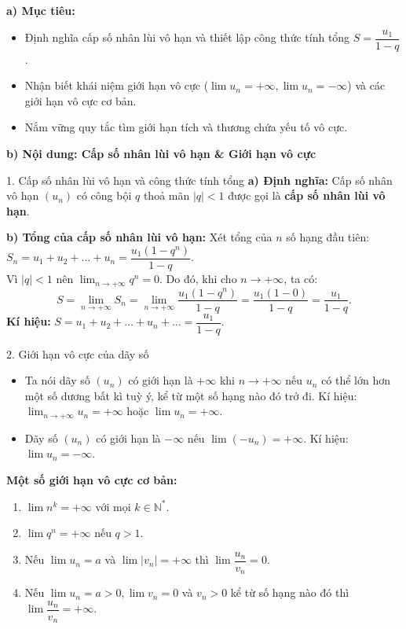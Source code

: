 \documentclass[12pt, a4paper]{article}
\begin{document}
\noindent \textbf{a) Mục tiêu:}
\begin{itemize}[leftmargin=0.6cm]
    \item Định nghĩa cấp số nhân lùi vô hạn và thiết lập công thức tính tổng $S = \dfrac{u_1}{1 - q}$.
    \item Nhận biết khái niệm giới hạn vô cực ($\lim u_n = +\infty, \lim u_n = -\infty$) và các giới hạn vô cực cơ bản.
    \item Nắm vững quy tắc tìm giới hạn tích và thương chứa yếu tố vô cực.
\end{itemize}

\noindent \textbf{b) Nội dung: Cấp số nhân lùi vô hạn \& Giới hạn vô cực}

\begin{pedabox}{1. Cấp số nhân lùi vô hạn và công thức tính tổng}
\textbf{a) Định nghĩa:} Cấp số nhân vô hạn $(u_n)$ có công bội $q$ thoả mãn $|q| < 1$ được gọi là \textbf{cấp số nhân lùi vô hạn}.

\textbf{b) Tổng của cấp số nhân lùi vô hạn:}
Xét tổng của $n$ số hạng đầu tiên: $S_n = u_1 + u_2 + \dots + u_n = \dfrac{u_1(1 - q^n)}{1 - q}$.\\
Vì $|q| < 1$ nên $\lim_{n \to +\infty} q^n = 0$. Do đó, khi cho $n \to +\infty$, ta có:
$$S = \lim_{n \to +\infty} S_n = \lim_{n \to +\infty} \dfrac{u_1(1 - q^n)}{1 - q} = \dfrac{u_1(1 - 0)}{1 - q} = \dfrac{u_1}{1 - q}.$$
\textbf{Kí hiệu:} $S = u_1 + u_2 + \dots + u_n + \dots = \dfrac{u_1}{1 - q}$.
\end{pedabox}

\begin{pedabox}{2. Giới hạn vô cực của dãy số}
\begin{itemize}[leftmargin=0.6cm]
    \item Ta nói dãy số $(u_n)$ có giới hạn là $+\infty$ khi $n \to +\infty$ nếu $u_n$ có thể lớn hơn một số dương bất kì tuỳ ý, kể từ một số hạng nào đó trở đi. Kí hiệu: $\lim_{n \to +\infty} u_n = +\infty$ hoặc $\lim u_n = +\infty$.
    \item Dãy số $(u_n)$ có giới hạn là $-\infty$ nếu $\lim (-u_n) = +\infty$. Kí hiệu: $\lim u_n = -\infty$.
\end{itemize}

\textbf{Một số giới hạn vô cực cơ bản:}
\begin{enumerate}[leftmargin=0.6cm]
    \item $\lim n^k = +\infty$ với mọi $k \in \mathbb{N}^*$.
    \item $\lim q^n = +\infty$ nếu $q > 1$.
    \item Nếu $\lim u_n = a$ và $\lim |v_n| = +\infty$ thì $\lim \dfrac{u_n}{v_n} = 0$.
    \item Nếu $\lim u_n = a > 0, \lim v_n = 0$ và $v_n > 0$ kể từ số hạng nào đó thì $\lim \dfrac{u_n}{v_n} = +\infty$.
\end{enumerate}
\end{pedabox}
\end{document}
